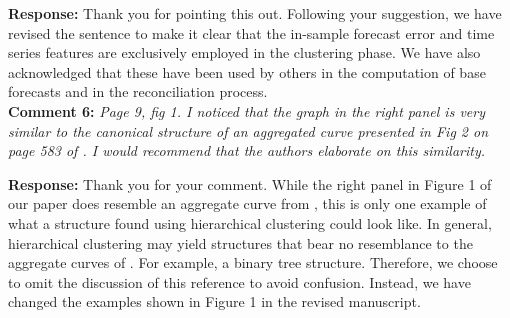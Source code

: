 \documentclass{article}
\numberwithin{equation}{section}
\theoremstyle{plain}
\theoremstyle{definition}
\theoremstyle{remark}
\begin{document}
\medskip
\noindent \textbf{Response:}  %
{Thank you for pointing this out. Following your suggestion, we have revised the sentence to make it clear that the in-sample forecast error and time series features are exclusively employed in the clustering phase. We have also acknowledged that these have been used by others in the computation of base forecasts and in the reconciliation process.}\\


\textbf{Comment 6:} \textit{Page 9, fig 1. I noticed that the graph in the right panel is very similar to the canonical structure of an aggregated curve presented in Fig 2 on page 583 of \cite{ghelasiHierarchicalForecastingAggregated2024}. I would recommend that the authors elaborate on this similarity.}

\medskip

\noindent \textbf{Response:} {Thank you for your comment. 
While the right panel in Figure 1 of our paper does resemble an aggregate curve from \cite{ghelasiHierarchicalForecastingAggregated2024}, this is only one example of what a structure found using hierarchical clustering could look like. In general, hierarchical clustering may yield structures that bear no resemblance to the aggregate curves of  \cite{ghelasiHierarchicalForecastingAggregated2024}. For example,  a binary tree structure. Therefore, we choose to omit the discussion of this reference to avoid confusion. Instead, we have changed the examples shown in Figure 1 in the revised manuscript.} \\
\end{document}
